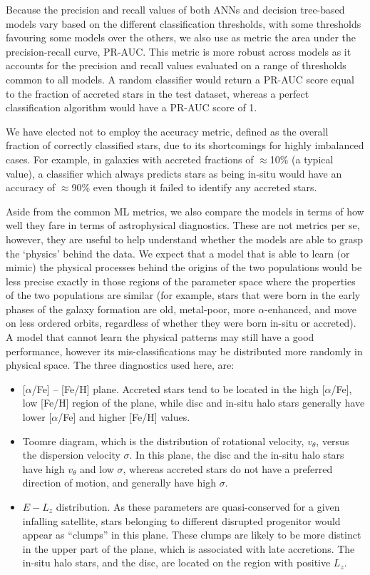 Because the precision and recall values of both ANNs and decision tree-based models vary based on the different classification thresholds, with some thresholds favouring some models over the others, we also use as metric the area under the precision-recall curve, PR-AUC. This metric is more robust across models as it accounts for the precision and recall values evaluated on a range of thresholds common to all models. A random classifier would return a PR-AUC score equal to the fraction of accreted stars in the test dataset, whereas a perfect classification algorithm would have a PR-AUC score of 1.

We have elected not to employ the accuracy metric, defined as the overall fraction of correctly classified stars, due to its shortcomings for highly imbalanced cases.  For example, in galaxies with accreted fractions of $\approx$10\% (a typical value), a classifier which always predicts stars as being in-situ would have an accuracy of $\approx$90\% even though it failed to identify any accreted stars.

Aside from the common ML metrics, we also compare the models in terms of how well they fare in terms of astrophysical diagnostics. These are not metrics per se, however, they are useful to help understand whether the models are able to grasp the `physics' behind the data. We expect that a model that is able to learn (or mimic) the physical processes behind the origins of the two populations would be less precise exactly in those regions of the parameter space where the properties of the two populations are similar (for example, stars that were born in the early phases of the galaxy formation are old, metal-poor, more $\alpha$-enhanced, and move on less ordered orbits, regardless of whether they were born in-situ or accreted). A model that cannot learn the physical patterns may still have a good performance, however its mis-classifications may be distributed more randomly in physical space. The three diagnostics used here, are:

\begin{itemize}
\item{[$\alpha$/Fe] -- [Fe/H] plane. Accreted stars tend to be located in the high [$\alpha$/Fe], low [Fe/H] region of the plane, while disc and in-situ halo stars generally have lower [$\alpha$/Fe] and higher [Fe/H] values.}
\item{Toomre diagram, which is the distribution of rotational velocity, $v_{\theta}$, versus the dispersion velocity $\sigma$. In this plane, the disc and the in-situ halo stars have high $v_{\theta}$ and low $\sigma$, whereas accreted stars do not have a preferred direction of motion, and generally have high $\sigma$.}
\item{$E-L_{z}$ distribution. As these parameters are quasi-conserved for a given infalling satellite, stars belonging to different disrupted progenitor would appear as ``clumps'' in this plane. These clumps are likely to be more distinct in the upper part of the plane, which is associated with late accretions. The in-situ halo stars, and the disc, are located on the region with positive $L_z$.}
\end{itemize}



